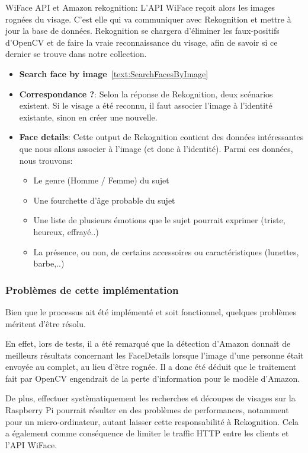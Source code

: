 WiFace API et Amazon rekognition:
L'API WiFace reçoit alors les images rognées du visage. 
C'est elle qui va communiquer avec Rekognition et mettre à jour la base de données.
Rekognition se chargera d'éliminer les faux-positifs d'OpenCV et de faire la vraie reconnaissance du visage,
afin de savoir si ce dernier se trouve dans notre collection.
\begin{itemize}
    \item \textbf{Search face by image}~\ref{text:SearchFacesByImage}
    \item \textbf{Correspondance ?}: Selon la réponse de Rekognition, deux scénarios existent. Si le visage a été reconnu, il faut associer l'image à l'identité existante, sinon en créer une nouvelle.
    \item \textbf{Face details}: Cette output de Rekognition contient des données intéressantes que nous allons associer à l'image (et donc à l'identité). Parmi ces données, nous trouvons:
    \begin{itemize}
        \item Le genre (Homme / Femme) du sujet
        \item Une fourchette d'âge probable du sujet
        \item Une liste de plusieurs émotions que le sujet pourrait exprimer (triste, heureux, effrayé..)
        \item La présence, ou non, de certains accessoires ou caractéristiques (lunettes, barbe,..)
    \end{itemize} 
\end{itemize} 

\subsubsection{Problèmes de cette implémentation}\label{sec:probleme_workflow}
Bien que le processus ait été implémenté et soit fonctionnel,
quelques problèmes méritent d'être résolu.

En effet, lors de tests, il a été remarqué que la détection d'Amazon
donnait de meilleurs résultats concernant les FaceDetails lorsque l'image d'une personne
était envoyée au complet, au lieu d'être rognée. Il a donc été déduit que le traitement fait par OpenCV engendrait de la perte
d'information pour le modèle d'Amazon.

De plus, effectuer systèmatiquement les recherches et découpes de visages sur la Raspberry Pi pourrait résulter en des problèmes de
performances, notamment pour un micro-ordinateur, autant laisser cette responsabilité à Rekognition. Cela a également comme conséquence de limiter
le traffic HTTP entre les clients et l'API WiFace.


